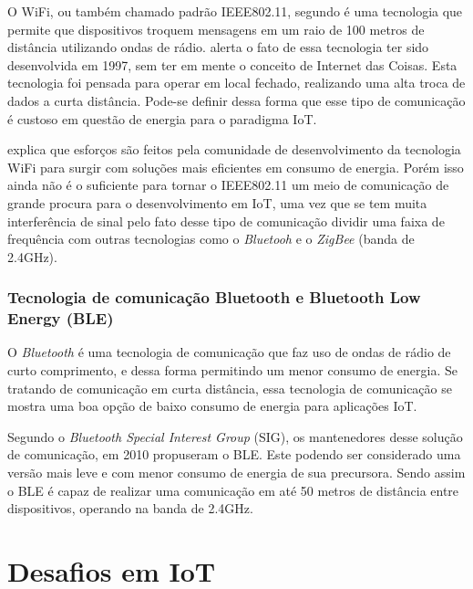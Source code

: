 \documentclass[
    hidelinks,
	12pt,				%
	openany,
	oneside, 
	a4paper,			%
	english,			%
	french,				%
	spanish,			%
	brazil				%
	]{abntex2}
\begin{document}
O WiFi, ou também chamado padrão IEEE802.11, segundo \citeauthor{al-fuqaha2015} é uma tecnologia que permite que dispositivos troquem mensagens em um raio de 100 metros de distância utilizando ondas de rádio. \cite{palattella2016} alerta o fato de essa tecnologia ter sido desenvolvida em 1997, sem ter em mente o conceito de Internet das Coisas. Esta tecnologia foi pensada para operar em local fechado, realizando uma alta troca de dados a curta distância. Pode-se definir dessa forma que esse tipo de comunicação é custoso em questão de energia para o paradigma IoT. 
	
\citeauthor{palattella2016} explica que esforços são feitos pela comunidade de desenvolvimento da tecnologia WiFi para surgir com soluções mais eficientes em consumo de energia. Porém isso ainda não é o suficiente para tornar o IEEE802.11 um meio de comunicação de grande procura para o desenvolvimento em IoT, uma vez que se tem muita interferência de sinal pelo fato desse tipo de comunicação dividir uma faixa de frequência com outras tecnologias como o \textit{Bluetooh} e o \textit{ZigBee} (banda de 2.4GHz).

\subsubsection{Tecnologia de comunicação Bluetooth e Bluetooth Low Energy (BLE)}

O \textit{Bluetooth} é uma tecnologia de comunicação que faz uso de ondas de rádio de curto comprimento, e dessa forma permitindo um menor consumo de energia. Se tratando de comunicação em curta distância, essa tecnologia de comunicação se mostra uma boa opção de baixo consumo de energia para aplicações IoT. 

Segundo \citeauthor{palattella2016} o \textit{Bluetooth Special Interest Group} (SIG), os mantenedores desse solução de comunicação, em 2010 propuseram o BLE. Este podendo ser considerado uma versão mais leve e com menor consumo de energia de sua precursora. Sendo assim o BLE é capaz de realizar uma comunicação em até 50 metros de distância entre dispositivos, operando na banda de 2.4GHz.






\section{Desafios em IoT}
\end{document}
